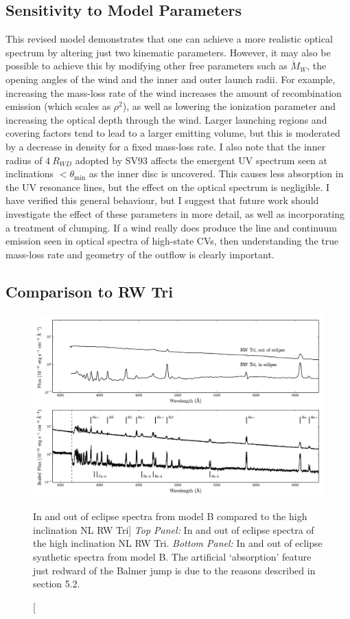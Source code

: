 \subsection{Sensitivity to Model Parameters}
\label{sec:cv_params}
This revised model demonstrates that one can achieve a more
realistic optical spectrum by altering just two kinematic parameters. 
However, it may also be possible to achieve this by modifying
other free parameters such as $\dot{M}_{W}$, the opening angles of the wind and the 
inner and outer launch radii. For example, increasing the mass-loss rate of the wind
increases the amount of recombination emission (which scales as $\rho^2$), 
as well as lowering the ionization parameter and increasing the optical depth through the wind. 
Larger launching regions and covering factors tend to lead to a larger emitting volume, 
but this is moderated by a decrease in density 
for a fixed mass-loss rate. I also note that the inner radius of $4~R_{WD}$ adopted by SV93 
affects the emergent UV spectrum seen at inclinations $<\theta_{\mathrm{min}}$ as 
the inner disc is uncovered. This causes less absorption in the UV resonance lines,
but the effect on the optical spectrum is negligible.
I have verified this general behaviour, but
I suggest that future work should investigate the effect of these parameters in more detail,
as well as incorporating a treatment of clumping.
If a wind really does produce the line and continuum emission seen in optical spectra of high-state CVs, then
understanding the true mass-loss rate and geometry of the outflow is clearly important.


\subsection{Comparison to RW Tri}
\label{sec:rwtri}
\begin{figure}
\includegraphics[width=0.9\textheight, angle=270]{figures/05-cvpaper/fig13.png}
\caption
[In and out of eclipse spectra from model B compared to the high
inclination NL RW Tri]
{{\sl Top Panel:} In and out of eclipse spectra of the high
inclination NL RW Tri. {\sl Bottom Panel:} In and out of eclipse synthetic
spectra from model B.
The artificial `absorption' feature just redward of the Balmer jump
is due to the reasons described in section 5.2.}
\label{rwtricomp}
\end{figure}

